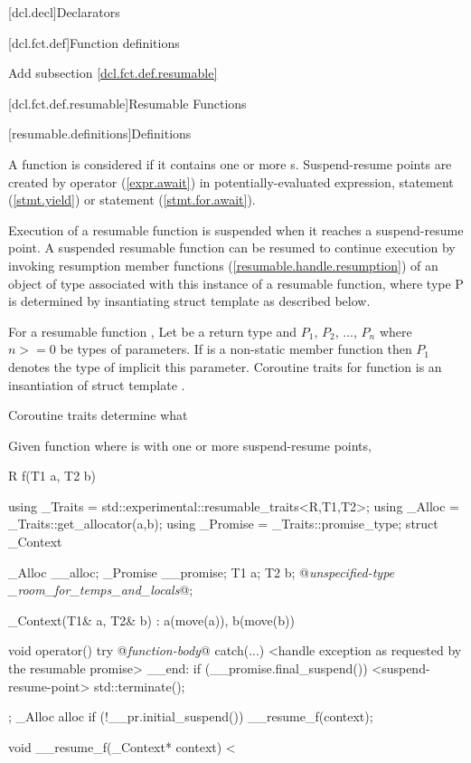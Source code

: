 
[dcl.decl]{Declarators}

\setcounter{section}{3}
[dcl.fct.def]{Function definitions}

Add subsection \ref{dcl.fct.def.resumable}

\setcounter{subsection}{3}
[dcl.fct.def.resumable]{Resumable Functions}

[resumable.definitions]{Definitions}

\pnum
A function is considered  if it contains
one or more s. 
Suspend-resume points are created by  operator (\ref{expr.await}) in potentially-evaluated expression,
 statement (\ref{stmt.yield}) 
or  statement (\ref{stmt.for.await}).


\pnum
Execution of a resumable function is suspended when it reaches a suspend-resume point.
A suspended resumable function can be resumed
to continue execution by invoking
resumption member functions (\ref{resumable.handle.resumption}) of an object of  type
associated with this instance of a resumable function, where type P
is determined by insantiating struct template  as described below. 

\pnum

\pnum
For a resumable function , Let  be a return type and $P_1$, $P_2$, ..., $P_n$
where $n >= 0$ be types of parameters. If  is a non-static member function then $P_1$ denotes the type of implicit this parameter. 
Coroutine traits for function  is an insantiation of
struct template .

\pnum
Coroutine traits determine what 


\pnum Given function  where  is  with one or more suspend-resume points, 

\begin{codeblock}
	R f(T1 a, T2 b) {
		using _Traits = std::experimental::resumable_traits<R,T1,T2>;
		using _Alloc = _Traits::get_allocator(a,b);
		using _Promise = _Traits::promise_type;
		struct _Context {
			_Alloc __alloc;
			_Promise __promise;
			T1 a;
			T2 b;
			@\textit{unspecified-type _room_for_temps_and_locals}@;
			
			_Context(T1& a, T2& b) : a(move(a)), b(move(b)) {}
			
			void operator() {
				try { 
					@\textit{function-body}@ 
				} catch(...) {
					<handle exception as requested by the resumable promise>
				}
				__end:  
				if (__promise.final_suspend()) {
					<suspend-resume-point>
					std::terminate();
				}			
			}
		};
		_Alloc alloc
		if (!__pr.initial_suspend()) {
			__resume_f(context);
		}
	}
	
	void __resume_f(_Context* context) {
	<
}
\end{codeblock}

